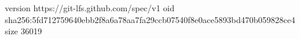 version https://git-lfs.github.com/spec/v1
oid sha256:5fd712759640ebb2f8a6a78aa7fa29ccb07540f8e0ace5893bd470b059828ce4
size 36019
